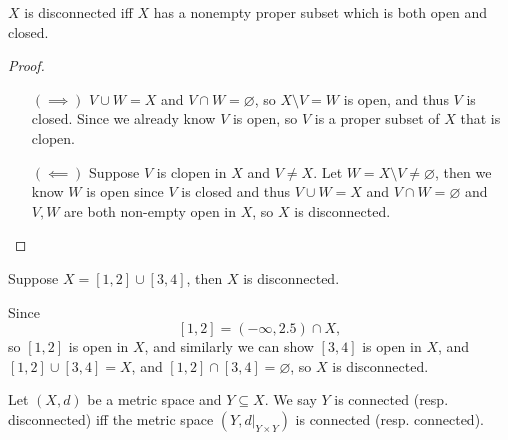 \begin{remark}
    \(X\) is disconnected iff \(X\) has a nonempty proper subset which is both open and closed.  
\end{remark}
\begin{proof}
    \vphantom{text}
    \begin{itemize}
        \item [\((\implies )\)] \(V \cup W = X\) and \(V \cap W = \varnothing \), so \(X \setminus V = W\) is open, and thus \(V\) is closed. Since we already know \(V\) is open, so \(V\) is a proper subset of \(X\) that is clopen. 
        \item [\((\impliedby )\)] Suppose \(V\) is clopen in \(X\) and \(V \neq X\). Let \(W = X \setminus V \neq \varnothing \), then we know \(W\) is open since \(V\) is closed and thus \(V \cup W = X\) and \(V \cap W = \varnothing \) and \(V, W\) are both non-empty open in \(X\), so \(X\) is disconnected.               
    \end{itemize}
\end{proof}

\begin{eg}
    Suppose \(X = [1, 2] \cup [3, 4]\), then \(X\) is disconnected.  
\end{eg}
\begin{explanation}
    Since 
    \[
        [1, 2] = (-\infty , 2.5) \cap X,
    \] so \([1, 2]\) is open in \(X\), and similarly we can show \([3, 4]\) is open in \(X\), and \([1, 2] \cup [3, 4] = X\), and \([1, 2] \cap [3, 4] = \varnothing \), so \(X\) is disconnected.       
\end{explanation}

\begin{definition}
    Let \((X, d)\) be a metric space and \(Y \subseteq X\). We say \(Y\) is connected (resp. disconnected) iff the metric space \(\left( Y, d \vert_{Y \times Y} \right) \) is connected (resp. connected).    
\end{definition}

